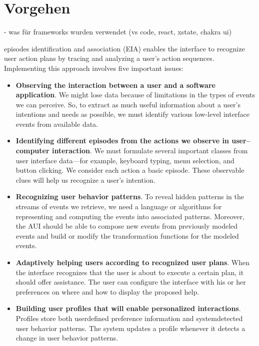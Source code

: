 \chapter{Vorgehen}
- was für frameworks wurden verwendet (vs code, react, xstate, chakra ui)

episodes identification and association (EIA) enables the interface to recognize user action plans by tracing
and analyzing a user’s action sequences. Implementing this approach involves five important issues:
\begin{itemize}
    \item \textbf{Observing the interaction between a user and a software application}. We might lose data 
    because of limitations in the types of events we can perceive. So, to extract as much useful
    information about a user’s intentions and needs as possible, we must identify various low-level
    interface events from available data.
    \item \textbf{Identifying different episodes from the actions we observe in user–computer interaction}. We
    must formulate several important classes from user interface data—for example, keyboard
    typing, menu selection, and button clicking. We consider each action a basic episode. These
    observable clues will help us recognize a user’s intention.
    \item \textbf{Recognizing user behavior patterns}. To reveal hidden patterns in the streams of events we
    retrieve, we need a language or algorithms for representing and computing the events into
    associated patterns. Moreover, the AUI should be able to compose new events from previously
    modeled events and build or modify the transformation functions for the modeled events.
    \item \textbf{Adaptively helping users according to recognized user plans}. When the interface recognizes
    that the user is about to execute a certain plan, it should offer assistance. The user can configure
    the interface with his or her preferences on where and how to display the proposed help.
    \item \textbf{Building user profiles that will enable personalized interactions}. Profiles store both userdefined
    preference information and systemdetected user behavior patterns. The system updates a profile whenever it detects a change
    in user behavior patterns.
\end{itemize}

